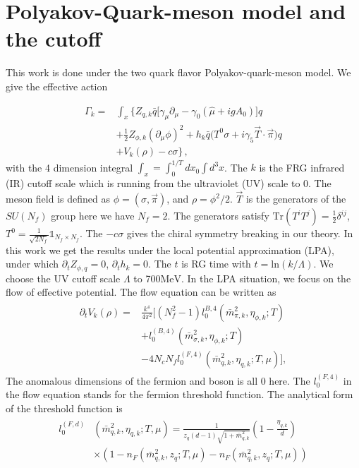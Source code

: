 \documentclass[%
reprint,
superscriptaddress,
showpacs,preprintnumbers,
 amsmath,amssymb,
 aps,
prl,
]{revtex4-1}
\begin{document}
\section{Polyakov-Quark-meson model and the cutoff}
\label{sec:pqm}




This work is done under the two quark flavor Polyakov-quark-meson model. We give the effective action

\begin{align}
  \Gamma_k=&\int_x \bigg\{Z_{q,k}\bar{q} \Big [\gamma_\mu \partial_\mu -\gamma_0(\hat\mu+igA_0) \Big ]q \nonumber\\[2ex]
  &+\frac{1}{2}Z_{\phi,k}(\partial_\mu \phi)^2\nonumber+h_k\bar{q}\big(T^0\sigma+i\gamma_5\vec{T}\cdot \vec{\pi}\big)q\\[2ex]
  &+V_k(\rho)-c\sigma \bigg\}\,,
\end{align}
with the 4 dimension integral $\int_x=\int^{1/T}_0dx_0\int d^3x$. The $k$ is the FRG infrared (IR) cutoff scale which is running from the ultraviolet (UV) scale to 0. The meson field is defined as $\phi=(\sigma,\vec{\pi})$, and $\rho=\phi^2/2$. $\vec{T}$ is the generators of the $SU(N_f)$ group here we have $N_f=2$. The generators satisfy $\mathrm{Tr}(T^iT^j)=\frac{1}{2}\delta^{ij}$, $T^0=\frac{1}{\sqrt{2N_f}}\mathbb{1}_{N_f\times N_f}$. The $-c\sigma$ gives the chiral symmetry breaking in our theory. In this work we get the results under the local potential approximation (LPA), under which $\partial_tZ_{\phi,q}=0$, $\partial_t h_k=0$. The $t$ is RG time with $t=\mathrm{ln}(k/\Lambda)$. We choose the UV cutoff scale $\Lambda$ to 700$\mathrm{MeV}$. In the LPA situation, we focus on the flow of effective potential.
 The flow equation can be written as
\begin{align}
\begin{split}
   \partial_t V_k(\rho)=&\frac{k^4}{4\pi^2}\big[(N^2_f-1)l^{B,4}_{0}(\bar{m}^2_{\pi,k},\eta_{\phi,k};T)\\
   &+l^{(B,4)}_{0}(\bar{m}^2_{\sigma,k},\eta_{\phi,k};T)\\
   &-4N_cN_fl^{(F,4)}_{0}(\bar{m}^2_{q,k},\eta_{q,k};T,\mu)\big],
\end{split}
\end{align}
The anomalous dimensions of the fermion and boson is all 0 here. The $l^{(F,4)}_{0}$ in the flow equation stands for the fermion threshold function. The analytical form of the threshold function is 
\begin{align}
\begin{split}
l^{(F,d)}_{0}&(\bar{m}^2_{q,k},\eta_{q,k};T,\mu)=\frac{1}{z_q(d-1)\sqrt{1+\bar{m}^2_{q,k}}}(1-\frac{\eta_{q,k}}{d})\\
&\times(1-n_F(\bar{m}^2_{q,k},z_q;T,\mu)-n_F(\bar{m}^2_{q,k},z_q;T,\mu))
\end{split}
\end{align}
\end{document}
